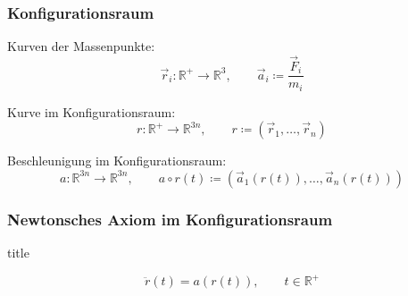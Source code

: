 \documentclass[aspectratio=169]{beamer}
\newcommand{\function}[3]{#1\colon#2\to#3}
\newcommand{\setReal}{\mathds{R}}
\newcommand{\separate}{,\qquad}
\newcommand{\define}{\coloneqq}
\newcommand{\curvedBrackets}[1]{\left(#1\right)}
\newenvironment{mybox}{
  \begin{beamercolorbox}[sep=0pt,center,shadow=true,rounded=true]{title}
}{
  \end{beamercolorbox}
}
\begin{document}
    \begin{frame}
      \frametitle{Konfigurationsraum}
      Kurven der Massenpunkte:
      \[
        \function{\vec{r}_i}{\setReal^+}{\setReal^{3}}
        \separate
        \vec{a}_i \define \frac{\vec{F}_i}{m_i}
      \]

      Kurve im Konfigurationsraum:
      \[
        \function{r}{\setReal^+}{\setReal^{3n}}
        \separate
        r \define \curvedBrackets{\vec{r}_1,\ldots,\vec{r}_n}
      \]

      Beschleunigung im Konfigurationsraum:
      \[
        \function{a}{\setReal^{3n}}{\setReal^{3n}}
        \separate
        a\circ r(t)\define \curvedBrackets{\vec{a}_1(r(t)),\ldots,\vec{a}_n(r(t))}
      \]

    \end{frame}

    \begin{frame}
      \frametitle{Newtonsches Axiom im Konfigurationsraum}
      \begin{mybox}
        \[
          \ddot{r}(t) = a(r(t))
          \separate
          t\in\setReal^+
        \]
      \end{mybox}
    \end{frame}
\end{document}
